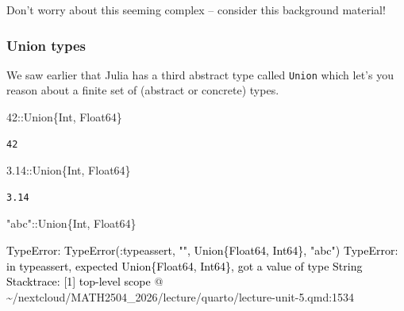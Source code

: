 \documentclass[
]{article}
\newenvironment{Shaded}{\begin{snugshade}}{\end{snugshade}}
\newcommand{\DataTypeTok}[1]{\textcolor[rgb]{0.68,0.00,0.00}{#1}}
\newcommand{\FloatTok}[1]{\textcolor[rgb]{0.68,0.00,0.00}{#1}}
\newcommand{\OperatorTok}[1]{\textcolor[rgb]{0.37,0.37,0.37}{#1}}
\newcommand{\StringTok}[1]{\textcolor[rgb]{0.13,0.47,0.30}{#1}}
\begin{document}
Don't worry about this seeming complex -- consider this background
material!

\subsubsection{Union types}\label{union-types}

We saw earlier that Julia has a third abstract type called
\texttt{Union} which let's you reason about a finite set of (abstract or
concrete) types.

\begin{Shaded}
\begin{Highlighting}[]
\FloatTok{42}\OperatorTok{::}\DataTypeTok{Union\{Int, Float64\}}
\end{Highlighting}
\end{Shaded}

\begin{verbatim}
42
\end{verbatim}

\begin{Shaded}
\begin{Highlighting}[]
\FloatTok{3.14}\OperatorTok{::}\DataTypeTok{Union\{Int, Float64\}}
\end{Highlighting}
\end{Shaded}

\begin{verbatim}
3.14
\end{verbatim}

\begin{Shaded}
\begin{Highlighting}[]
\StringTok{"abc"}\OperatorTok{::}\DataTypeTok{Union\{Int, Float64\}}
\end{Highlighting}
\end{Shaded}

\begin{Highlighting}
\textcolor{black}{TypeError: TypeError(:typeassert, "", Union\{Float64, Int64\}, "abc")}
\textcolor{black}{TypeError: in typeassert, expected Union\{Float64, Int64\}, got a value of type String}
\textcolor{black}{Stacktrace:}
\textcolor{black}{ [1] top-level scope}
\textcolor{black}{}\textcolor{QuartoInternalColor1}{   @}\textcolor{QuartoInternalColor1}{ }\textcolor{QuartoInternalColor1}{\textasciitilde{}/nextcloud/MATH2504\_2026/lecture/quarto/}\textcolor{QuartoInternalColor1}{}\textcolor{QuartoInternalColor1}{}\textcolor{QuartoInternalColor1}{lecture-unit-5.qmd:1534}\textcolor{QuartoInternalColor1}{}\textcolor{QuartoInternalColor1}{}
\end{Highlighting}
\end{document}

